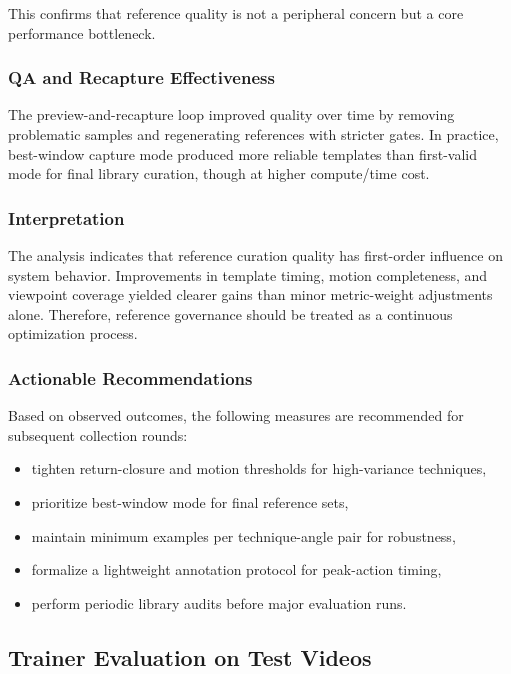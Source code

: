 \documentclass[12pt]{article}
\begin{document}
{This confirms that reference quality is not a peripheral concern but a core performance bottleneck.

\subsubsection{QA and Recapture Effectiveness}

The preview-and-recapture loop improved quality over time by removing problematic samples and regenerating references with stricter gates. In practice, best-window capture mode produced more reliable templates than first-valid mode for final library curation, though at higher compute/time cost.

\subsubsection{Interpretation}

The analysis indicates that reference curation quality has first-order influence on system behavior. Improvements in template timing, motion completeness, and viewpoint coverage yielded clearer gains than minor metric-weight adjustments alone. Therefore, reference governance should be treated as a continuous optimization process.

\subsubsection{Actionable Recommendations}

Based on observed outcomes, the following measures are recommended for subsequent collection rounds:

\begin{itemize}
    \item tighten return-closure and motion thresholds for high-variance techniques,
    \item prioritize best-window mode for final reference sets,
    \item maintain minimum examples per technique-angle pair for robustness,
    \item formalize a lightweight annotation protocol for peak-action timing,
    \item perform periodic library audits before major evaluation runs.
\end{itemize}

\subsection{Trainer Evaluation on Test Videos}

}
\end{document}
